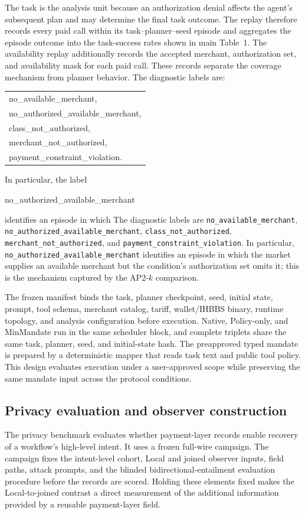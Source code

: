 \documentclass[letterpaper]{article}
\begin{document}
The task is the analysis unit because an authorization denial affects the
agent's subsequent plan and may determine the final task outcome. The replay
therefore records every paid call within its task--planner--seed episode and
aggregates the episode outcome into the task-success rates shown in main Table~1.
The availability replay additionally records the accepted merchant,
authorization set, and availability mask for each paid call. These records
separate the coverage mechanism from planner behavior.
\ifdefined\MMAAAITwoColumn
The diagnostic labels are:
\begin{center}
\small\ttfamily
\begin{tabular}{@{}l@{}}
no\_available\_merchant,\\
no\_authorized\_available\_merchant,\\
class\_not\_authorized,\\
merchant\_not\_authorized,\\
payment\_constraint\_violation.
\end{tabular}
\end{center}
\noindent In particular, the label
\begin{center}
\small\ttfamily no\_authorized\_available\_merchant
\end{center}
\noindent identifies an episode in which
\else
The diagnostic labels are \texttt{no\_available\_merchant},
\texttt{no\_authorized\_available\_merchant},
\texttt{class\_not\_authorized}, \texttt{merchant\_not\_authorized}, and
\texttt{payment\_constraint\_violation}. In particular,
\texttt{no\_authorized\_available\_merchant} identifies an episode in which
\fi
the market supplies an available merchant but the condition's authorization
set omits it; this is the mechanism captured by the AP2-\(k\) comparison.

The frozen manifest binds the task, planner checkpoint, seed, initial state,
prompt, tool schema, merchant catalog, tariff, wallet/IHBBS binary, runtime
topology, and analysis configuration before execution. Native, Policy-only,
and MinMandate run in the same scheduler block, and complete triplets share
the same task, planner, seed, and initial-state hash. The preapproved typed
mandate is prepared by a deterministic mapper that reads task text and public
tool policy. This design evaluates execution under a user-approved scope while
preserving the same mandate input across the protocol conditions.

\subsection{Privacy evaluation and observer construction}
\label{app:privacy-evaluation-details}
The privacy benchmark evaluates whether payment-layer records enable recovery
of a workflow's high-level intent. It uses a frozen full-wire campaign. The
campaign fixes the
intent-level cohort, Local and joined observer inputs, field paths, attack
prompts, and the blinded bidirectional-entailment evaluation procedure before
the records are scored. Holding these elements fixed makes the Local-to-joined
contrast a direct measurement of the additional information provided by a
reusable payment-layer field.
\end{document}
